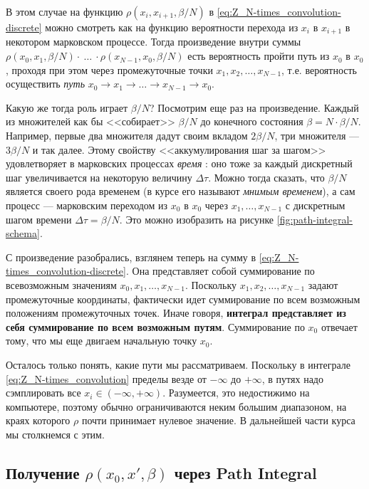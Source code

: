 \begin{lecture}
В этом случае на функцию $\rho (x_i, x_{i+1}, \beta / N)$ в \eqref{eq:Z_N-times_convolution-discrete} можно смотреть как на функцию вероятности перехода из $x_i$ в $x_{i+1}$ в некотором марковском процессе. 
Тогда произведение внутри суммы $\rho (x_0, x_1, \beta /N)\cdot~\dots~\cdot\rho(x_{N-1}, x_0, \beta /N)$ есть вероятность пройти путь из $x_0$ в $x_0$, проходя при этом через промежуточные точки $x_1, x_2, \dots, x_{N-1} $, т.е. вероятность осуществить \textit{путь} $x_0 \rightarrow x_1 \rightarrow \dots \rightarrow x_{N-1} \rightarrow x_0$. 

Какую же тогда роль играет $\beta /N$?
Посмотрим еще раз на произведение. Каждый из множителей как бы <<собирает>> $\beta /N$ до конечного состояния $\beta = N \cdot \beta /N$.
Например, первые два множителя дадут своим вкладом $2\beta /N$, три множителя --- $3\beta /N$ и так далее.
Этому свойству <<аккумулирования шаг за шагом>> удовлетворяет в марковских процессах \textit{время} : оно тоже за каждый дискретный шаг увеличивается на некоторую величину $\Delta \tau$.
Можно тогда сказать, что $\beta /N$ является своего рода временем (в курсе его называют \textit{мнимым временем}), а сам процесс --- марковским переходом из $x_0$ в $x_0$ через $x_1, \dots, x_{N-1} $ с дискретным шагом времени $\Delta \tau = \beta /N$.
Это можно изобразить на рисунке \ref{fig:path-integral-schema}.

С произведение разобрались, взглянем теперь на сумму в \eqref{eq:Z_N-times_convolution-discrete}.
Она представляет собой суммирование по всевозможным значениям $x_0, x_1, \dots, x_{N-1}$.
Поскольку $x_1, x_2, \dots, x_{N-1}$ задают промежуточные координаты, фактически идет суммирование по всем возможным положениям промежуточных точек. Иначе говоря, \textbf{интеграл представляет из себя суммирование по всем возможным путям}.
Суммирование по $x_0$ отвечает тому, что мы еще двигаем начальную точку $x_0$.

Осталось только понять, какие пути мы рассматриваем.
Поскольку в интеграле \eqref{eq:Z_N-times_convolution} пределы везде от $-\infty$ до $+\infty$, в путях надо сэмплировать все $x_i \in (-\infty, +\infty)$.
Разумеется, это недостижимо на компьютере, поэтому обычно ограничиваются неким большим диапазоном, на краях которого $\rho$ почти принимает нулевое значение.
В дальнейшей части курса мы столкнемся с этим.

\subsection{Получение $\rho (x_0, x', \beta)$ через Path Integral}


\end{lecture}
